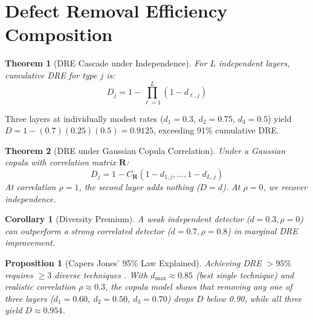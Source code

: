 \documentclass[11pt, a4paper, copyright]{googledeepmind}
\newtheorem{theorem}{Theorem}[section]
\newtheorem{proposition}{Proposition}[section]
\newtheorem{corollary}{Corollary}[section]
\begin{document}
\section{Defect Removal Efficiency Composition}
\label{sec:dre}

\begin{theorem}[DRE Cascade under Independence]
\label{thm:drecascade}
For $L$ independent layers, cumulative DRE for type $j$ is:
\begin{equation}
D_j = 1 - \prod_{\ell=1}^{L} (1 - d_{\ell,j})
\end{equation}
\end{theorem}

Three layers at individually modest rates ($d_1 = 0.3$, $d_2 = 0.75$, $d_3 = 0.5$) yield $D = 1 - (0.7)(0.25)(0.5) = 0.9125$, exceeding 91\% cumulative DRE.

\begin{theorem}[DRE under Gaussian Copula Correlation]
\label{thm:copula}
Under a Gaussian copula \citep{sklar1959} with correlation matrix $\mathbf{R}$:
\begin{equation}
D_j = 1 - C_{\mathbf{R}}(1 - d_{1,j}, \ldots, 1 - d_{L,j})
\end{equation}
At correlation $\rho = 1$, the second layer adds nothing ($D = d$). At $\rho = 0$, we recover independence.
\end{theorem}

\begin{corollary}[Diversity Premium]
\label{cor:diversity}
A weak independent detector ($d = 0.3, \rho = 0$) can outperform a strong correlated detector ($d = 0.7, \rho = 0.8$) in marginal DRE improvement.
\end{corollary}

\begin{proposition}[Capers Jones' 95\% Law Explained]
\label{prop:jones}
Achieving DRE $> 95\%$ requires ${\geq}3$ diverse techniques \citep{capersjones2012}. With $d_{\max} \approx 0.85$ (best single technique) and realistic correlation $\rho \approx 0.3$, the copula model shows that removing any one of three layers ($d_1 = 0.60$, $d_2 = 0.50$, $d_3 = 0.70$) drops $D$ below 0.90, while all three yield $D \approx 0.954$.
\end{proposition}


\end{document}
